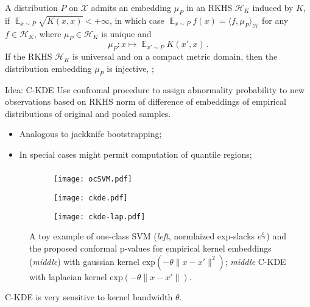 \documentclass[t]{beamer}  %
\newcommand{\Xcal}{\mathcal{X}}
\newcommand{\Hcal}{\mathcal{H}}
\newcommand{\ex}{\mathop{\mathbb{E}}\nolimits}
\begin{document}
\begin{frame}[c]\frametitle{\insertsection}
  \framesubtitle{\insertsubsection}
  A distribution $P$ on $\Xcal$ admits an embedding $\mu_P$ in an RKHS $\Hcal_K$
  induced by $K$, if $\ex_{x\sim P} \sqrt{K(x,x)} < +\infty$, in which case
  $\ex_{x\sim P} f(x) = \langle f, \mu_P \rangle_\Hcal $ for any $f\in \Hcal_K$,
  where $\mu_P\in \Hcal_K$ is unique and
  $$ \mu_P: x \mapsto \ex_{x'\sim P} K(x', x) \,. $$
  If the RKHS $\Hcal_K$ is universal and on a compact metric domain, then the
  distribution embedding $\mu_P$ is injective, \cite{gretton2012};

  \begin{block}{Idea: C-KDE}
    Use confromal procedure to assign abnormality probability to new observations
    based on RKHS norm of difference of embeddings of empirical distributions of
    original and pooled samples.
    \begin{itemize}
      \item Analogous to jackknife bootstrapping;
      \item In special cases might permit computation of quantile regions;
    \end{itemize}
  \end{block}
\end{frame}

\begin{frame}[c, shrink=0]\frametitle{\insertsection}
  \framesubtitle{\insertsubsection}
  \begin{figure}%
    \centering
    \begin{subfigure}[b]{0.33\linewidth}
      \texttt{[image: ocSVM.pdf]}
    \end{subfigure}%
    \begin{subfigure}[b]{0.33\linewidth}
      \texttt{[image: ckde.pdf]}
    \end{subfigure}%
    \begin{subfigure}[b]{0.33\linewidth}
      \texttt{[image: ckde-lap.pdf]}
    \end{subfigure}%
    \caption{A toy example of one-class SVM (\textit{left}, normlaized exp-slacks
    $e^{\xi_i}$) and the proposed conformal p-values for empirical kernel embeddings
    (\textit{middle}) with gaussian kernel $\text{exp}(-\theta\|x-x'\|^2)$;
    \textit{middle} C-KDE with laplacian kernel $\text{exp}(-\theta\|x-x'\|)$.}
    \label{fig:gauss_1d_prof_gpr}
  \end{figure}
  C-KDE is very sensitive to kernel bandwidth $\theta$.
\end{frame}
\end{document}
